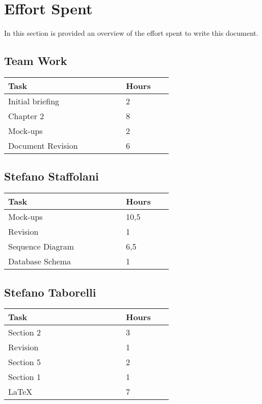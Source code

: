 \section{Effort Spent}
In this section is provided an overview of the effort spent to write this document.
\subsection{Team Work}
\begin{center}
\centering
    \begin{tabular}{@{}p{0.5\linewidth} p{0.2\linewidth}@{}}
        \hline
        \textbf{Task} & \textbf{Hours} \\ \hline
        Initial briefing & 2 \\ \hline
        Chapter 2 & 8 \\ \hline
        Mock-ups & 2\\ \hline
        Document Revision & 6 \\ \hline
    \end{tabular}
\end{center}

\subsection{Stefano Staffolani}
\begin{center}
\centering
    \begin{tabular}{@{}p{0.5\linewidth} p{0.2\linewidth}@{}}
        \hline
        \textbf{Task} & \textbf{Hours} \\ \hline
        Mock-ups & 10,5 \\ \hline
        Revision & 1 \\ \hline
        Sequence Diagram & 6,5\\ \hline
        Database Schema & 1 \\ \hline
    \end{tabular}
\end{center}

\subsection{Stefano Taborelli}
\begin{center}
\centering
    \begin{tabular}{@{}p{0.5\linewidth} p{0.2\linewidth}@{}}
        \hline
        \textbf{Task} & \textbf{Hours} \\ \hline
        Section 2 & 3 \\ \hline
        Revision & 1 \\ \hline
        Section 5 & 2 \\ \hline
        Section 1 & 1 \\ \hline
        \LaTeX & 7\\ \hline
    \end{tabular}
\end{center}

